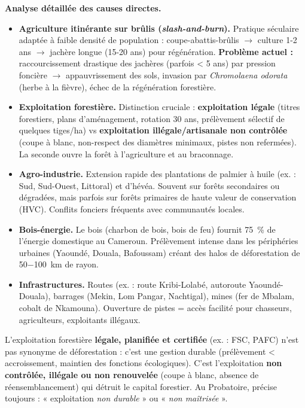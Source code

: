 \documentclass[11pt]{article}
\newcommand{\cle}[1]{{\popxbold\color{popdark}#1}}
\begin{document}
\textbf{Analyse détaillée des causes directes.}\par
\begin{itemize}
    \item \textbf{Agriculture itinérante sur brûlis (\emph{slash-and-burn}).} Pratique séculaire adaptée à faible densité de population : coupe-abattis-brûlis $\rightarrow$ culture 1-2 ans $\rightarrow$ jachère longue (15-20 ans) pour régénération. \textbf{Problème actuel :} raccourcissement drastique des jachères (parfois < 5 ans) par pression foncière $\rightarrow$ appauvrissement des sols, invasion par \emph{Chromolaena odorata} (herbe à la fièvre), échec de la régénération forestière.
    \item \textbf{Exploitation forestière.} Distinction cruciale : \textbf{exploitation légale} (titres forestiers, plans d'aménagement, rotation 30 ans, prélèvement sélectif de quelques tiges/ha) vs \textbf{exploitation illégale/artisanale non contrôlée} (coupe à blanc, non-respect des diamètres minimaux, pistes non refermées). La seconde ouvre la forêt à l'agriculture et au braconnage.
    \item \textbf{Agro-industrie.} Extension rapide des plantations de palmier à huile (ex. : Sud, Sud-Ouest, Littoral) et d'hévéa. Souvent sur forêts secondaires ou dégradées, mais parfois sur forêts primaires de haute valeur de conservation (HVC). Conflits fonciers fréquents avec communautés locales.
    \item \textbf{Bois-énergie.} Le bois (charbon de bois, bois de feu) fournit \approx \SI{75}{\%} de l'énergie domestique au Cameroun. Prélèvement intense dans les périphéries urbaines (Yaoundé, Douala, Bafoussam) créant des \cle{halos de déforestation} de \SI{50-100}{km} de rayon.
    \item \textbf{Infrastructures.} Routes (ex. : route Kribi-Lolabé, autoroute Yaoundé-Douala), barrages (Mekin, Lom Pangar, Nachtigal), mines (fer de Mbalam, cobalt de Nkamouna). Ouverture de pistes = accès facilité pour chasseurs, agriculteurs, exploitants illégaux.
\end{itemize}

\begin{attention}[Piège fréquent : amalgame exploitation forestière = déforestation]
L'exploitation forestière \textbf{légale, planifiée et certifiée} (ex. : FSC, PAFC) n'est pas synonyme de déforestation : c'est une \cle{gestion durable} (prélèvement < accroissement, maintien des fonctions écologiques). C'est l'exploitation \textbf{non contrôlée, illégale ou non renouvelée} (coupe à blanc, absence de réensemblancement) qui détruit le capital forestier. Au Probatoire, précise toujours : « exploitation \emph{non durable} » ou « \emph{non maîtrisée} ».
\end{attention}
\end{document}
